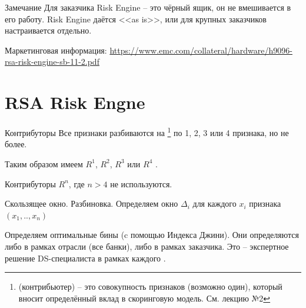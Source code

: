 \begin{frame}
	\begin{block}{Замечание}
		Для заказчика Risk Engine -- это чёрный ящик,
		он не вмешивается в его работу. 
		Risk Engine даётся <<as is>>, 
		или для крупных заказчиков настраивается отдельно.
	\end{block}
	\small
	Маркетинговая информация: \url{https://www.emc.com/collateral/hardware/h9096-rsa-risk-engine-sb-11-2.pdf}
\end{frame}

\begin{frame}
	
\end{frame}


\section{RSA Risk Engne}

\begin{frame}
	\begin{block}
		
	\end{block}
\end{frame}


\begin{frame}{Контрибуторы}
	Все признаки разбиваются на 
	\footnote{ (контрибьютер) -- это совокупность признаков (возможно один),
	который вносит определённый вклад в скоринговую модель. См. лекцию №2}
	по 1, 2, 3 или 4 признака, но не более. 
	
	Таким образом имеем $R^1$, $R^2$, $R^3$ или $R^4$ .
	
	Контрибуторы $R^n$, где $n>4$ не используются.	
\end{frame}

\begin{frame}{Скользящее окно. Разбиновка.}
	\footnotesize
	Определяем окно $\Delta_i$ для каждого $x_i$ признака 
	$(x_1, .., x_n)$
	\begin{center}
		\begin{tikzpicture}[scale=1.5]
			
		\end{tikzpicture}
	\end{center}
	Определяем оптимальные бины (c помощью Индекса Джини).
	Они определяются либо в рамках отрасли (все банки), либо в рамках заказчика.
	Это -- экспертное решение DS-специалиста в рамках каждого .
\end{frame}


